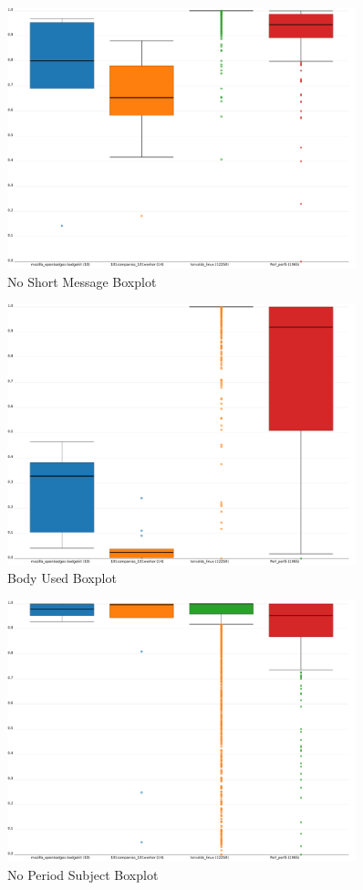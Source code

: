 \begin{figure}[h]
    \centering
    \includegraphics[width=0.9\textwidth]{img/no_short_message.pdf}
    \caption{No Short Message Boxplot}
    \label{fig:bp_no_short_message}
\end{figure}

\begin{figure}[h]
    \centering
    \includegraphics[width=0.9\textwidth]{img/body_used.pdf}
    \caption{Body Used Boxplot}
    \label{fig:bp_body_used}
\end{figure}

\begin{figure}[h]
    \centering
    \includegraphics[width=0.9\textwidth]{img/no_period_subject.pdf}
    \caption{No Period Subject Boxplot}
    \label{fig:bp_no_period_subject}
\end{figure}
